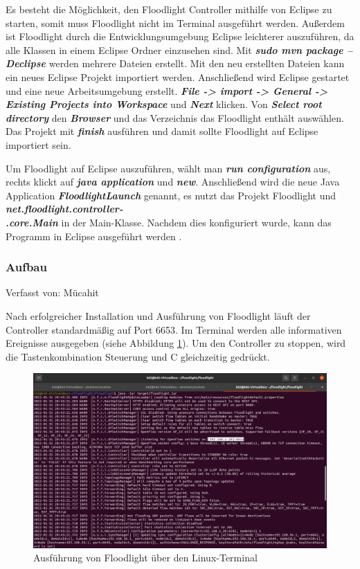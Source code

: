 \documentclass[fontsize=12pt,paper=a4,open=any,parskip=half,
  twoside=false,toc=listof,toc=bibliography,fleqn,leqno,
  captions=nooneline,captions=tableabove,british]{scrbook}
\begin{document}
Es besteht die Möglichkeit, den Floodlight Controller mithilfe von Eclipse zu starten, somit muss Floodlight nicht im Terminal ausgeführt werden. Außerdem ist Floodlight durch die Entwicklungsumgebung Eclipse leichterer auszuführen, da alle Klassen in einem Eclipse Ordner einzusehen sind. Mit \textit{\textbf{sudo mvn package –Declipse}} werden mehrere Dateien erstellt. Mit den neu erstellten Dateien kann ein neues Eclipse Projekt importiert werden. Anschließend wird Eclipse gestartet und eine neue Arbeitsumgebung erstellt. \textit{\textbf{File -> import -> General -> Existing Projects into Workspace}} und \textit{\textbf{Next}} klicken. Von \textit{\textbf{Select root directory}} den \textit{\textbf{Browser}} und das Verzeichnis das Floodlight enthält auswählen. Das Projekt mit \textit{\textbf{finish}} ausführen und damit sollte Floodlight auf Eclipse importiert sein.\par
Um Floodlight auf Eclipse auszuführen, wählt man \textit{\textbf{run configuration}} aus, rechts klickt auf \textit{\textbf{java application}} und \textit{\textbf{new}}. Anschließend wird die neue Java Application \textit{\textbf{FloodlightLaunch}} genannt, es nutzt das Projekt Floodlight und \textit{\textbf{net.floodlight.controller-\\.core.Main}} in der Main-Klasse. Nachdem dies konfiguriert wurde, kann das Programm in Eclipse ausgeführt werden \cite{install}.


\subsubsection{Aufbau}
{\tiny Verfasst von: Mücahit\par}
Nach erfolgreicher Installation und Ausführung von Floodlight läuft der Controller standardmäßig auf Port 6653. Im Terminal werden alle informativen Ereignisse ausgegeben (siehe Abbildung \ref{floodlight}). Um den Controller zu stoppen, wird die Tastenkombination Steuerung und C gleichzeitig gedrückt.

\begin{figure}[H]
 \centering
 \includegraphics[width=1.0\textwidth]{Bilder/floodlight}
 \captionsetup{justification=centering,margin=1cm}
 \caption{Ausführung von Floodlight über den Linux-Terminal}
 \label{floodlight}
\end{figure}
\end{document}
